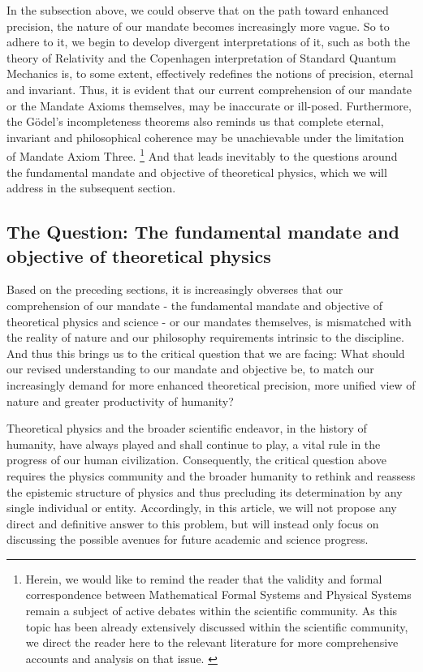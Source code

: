 \documentclass{article}
\begin{document}
In the subsection above, we could observe that on the path toward enhanced precision, the nature of our mandate becomes increasingly more vague. So to adhere to it, we begin to develop divergent interpretations of it, such as both the theory of Relativity and the Copenhagen interpretation of Standard Quantum Mechanics is, to some extent, effectively redefines the notions of precision, eternal and invariant. \cite{Weinberg2014a} Thus, it is evident that our current comprehension of our mandate or the Mandate Axioms themselves, may be inaccurate or ill-posed. Furthermore, the Gödel's incompleteness theorems \cite{Godel1931} also reminds us that complete eternal, invariant and philosophical coherence may be unachievable under the limitation of Mandate Axiom Three. \cite{Eren2025} \footnote{Herein, we would like to remind the reader that the validity and formal correspondence between Mathematical Formal Systems and Physical Systems remain a subject of active debates within the scientific community. As this topic has been already extensively discussed within the scientific community, we direct the reader here to the relevant literature for more comprehensive accounts and analysis on that issue. \cite{Eren2025}} \cite{perez2026} And that leads inevitably to the questions around the fundamental mandate and objective of theoretical physics, which we will address in the subsequent section.

\subsection{The Question: The fundamental mandate and objective of theoretical physics}

Based on the preceding sections, it is increasingly obverses that our comprehension of our mandate - the fundamental mandate and objective of theoretical physics and science - or our mandates themselves, is mismatched with the reality of nature and our philosophy requirements intrinsic to the discipline. \cite{cafiero2026} And thus this brings us to the critical question that we are facing: What should our revised understanding to our mandate and objective be, to match our increasingly demand for more enhanced theoretical precision, more unified view of nature and greater productivity of humanity?

Theoretical physics and the broader scientific endeavor, in the history of humanity, have always played and shall continue to play, a vital rule in the progress of our human civilization. Consequently, the critical question above requires the physics community and the broader humanity to rethink and reassess the epistemic structure of physics and thus precluding its determination by any single individual or entity. Accordingly, in this article, we will not propose any direct and definitive answer to this problem, but will instead only focus on discussing the possible avenues for future academic and science progress.
\end{document}
